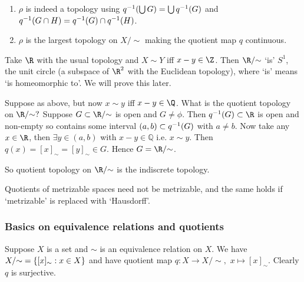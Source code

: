 \begin{remark}
    \begin{enumerate}
        \item $\rho$ is indeed a topology using $q^{-1}(\bigcup G) = \bigcup q^{-1}(G)$ and $q^{-1} (G\cap H) = q^{-1}(G)\cap q^{-1} (H)$.
    
        \item $\rho$ is the largest topology on $X/ {\sim}$ making the quotient map $q$ continuous.
    \end{enumerate} 
\end{remark}

\begin{example}
    Take $\R$ with the usual topology and $X\sim Y$ iff $x-y\in \Z$.
    Then $\R/ {\sim}$ `is' $S^1$, the unit circle (a subspace of $\R^2$ with the Euclidean topology), where `is' means `is homeomorphic to'.
    We will prove this later.
\end{example} 

\begin{example}
    Suppose as above, but now $x\sim y$ iff $x-y\in \Q$. What is the quotient topology on $\R/ {\sim}?$ 
    Suppose $G\subset \R/ {\sim}$ is open and $G\neq \phi$.
    Then $q\inv (G)\subset\R$ is open and non-empty so contains some interval $(a,b)\subset q^{-1} (G)$ with $a\neq b$. 
    Now take any $x\in \R$, then $\exists y\in (a,b)$ with $x-y\in \mathbb{Q}$ i.e. $x\sim y$. 
    Then $q(x) = [x]_\sim = [y]_\sim \in G$. Hence $G = \R/ {\sim}$. 
    
    So quotient topology on $\R/ {\sim}$ is the indiscrete topology.
\end{example} 

\begin{example}
    Quotients of metrizable spaces need not be metrizable, and the same holds if `metrizable' is replaced with `Hausdorff'.
\end{example} 

\subsubsection{Basics on equivalence relations and quotients}

Suppose $X$ is a set and $\sim$ is an equivalence relation on $X$. We have $X/ {\sim} = \{[x]_\sim : x\in X\}$ and have quotient map $q:X \to X/ {\sim},$ $x \mapsto [x]_\sim$. Clearly $q$ is surjective.

